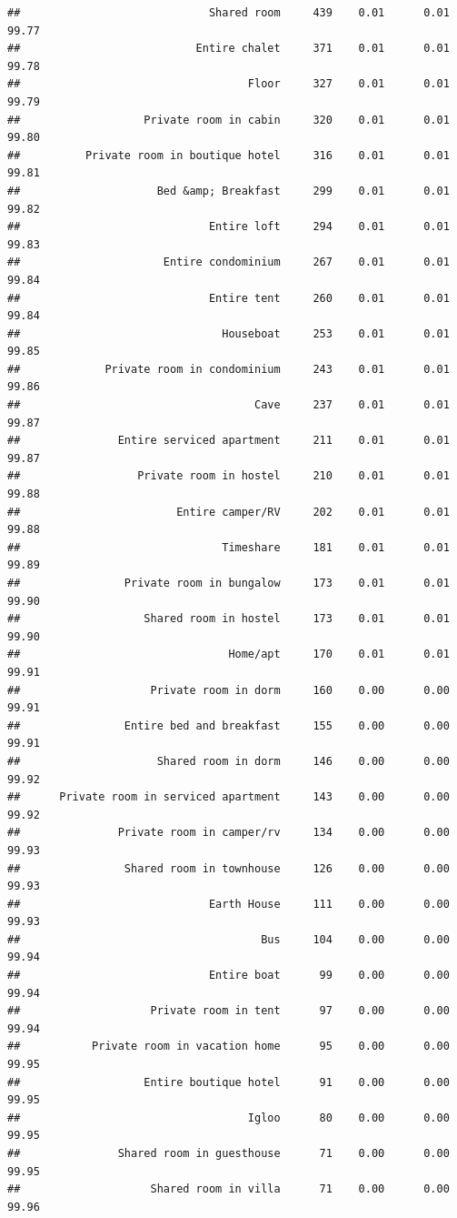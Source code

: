 \documentclass[]{article}
\begin{document}
\begin{verbatim}
##                             Shared room     439    0.01      0.01   99.77
##                           Entire chalet     371    0.01      0.01   99.78
##                                   Floor     327    0.01      0.01   99.79
##                   Private room in cabin     320    0.01      0.01   99.80
##          Private room in boutique hotel     316    0.01      0.01   99.81
##                     Bed &amp; Breakfast     299    0.01      0.01   99.82
##                             Entire loft     294    0.01      0.01   99.83
##                      Entire condominium     267    0.01      0.01   99.84
##                             Entire tent     260    0.01      0.01   99.84
##                               Houseboat     253    0.01      0.01   99.85
##             Private room in condominium     243    0.01      0.01   99.86
##                                    Cave     237    0.01      0.01   99.87
##               Entire serviced apartment     211    0.01      0.01   99.87
##                  Private room in hostel     210    0.01      0.01   99.88
##                        Entire camper/RV     202    0.01      0.01   99.88
##                               Timeshare     181    0.01      0.01   99.89
##                Private room in bungalow     173    0.01      0.01   99.90
##                   Shared room in hostel     173    0.01      0.01   99.90
##                                Home/apt     170    0.01      0.01   99.91
##                    Private room in dorm     160    0.00      0.00   99.91
##                Entire bed and breakfast     155    0.00      0.00   99.91
##                     Shared room in dorm     146    0.00      0.00   99.92
##      Private room in serviced apartment     143    0.00      0.00   99.92
##               Private room in camper/rv     134    0.00      0.00   99.93
##                Shared room in townhouse     126    0.00      0.00   99.93
##                             Earth House     111    0.00      0.00   99.93
##                                     Bus     104    0.00      0.00   99.94
##                             Entire boat      99    0.00      0.00   99.94
##                    Private room in tent      97    0.00      0.00   99.94
##           Private room in vacation home      95    0.00      0.00   99.95
##                   Entire boutique hotel      91    0.00      0.00   99.95
##                                   Igloo      80    0.00      0.00   99.95
##               Shared room in guesthouse      71    0.00      0.00   99.95
##                    Shared room in villa      71    0.00      0.00   99.96

\end{verbatim}
\end{document}
